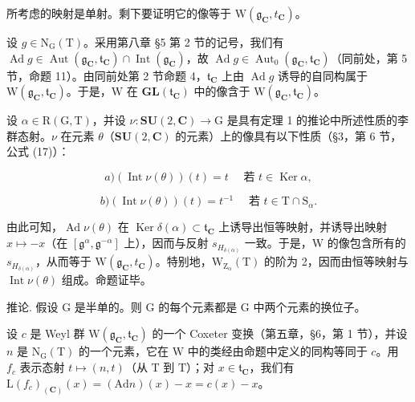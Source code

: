 所考虑的映射是单射。剩下要证明它的像等于 \(\mathrm{W}(\mathfrak{g}_{\mathbf{C}}, t_{\mathbf{C}})\)。

设 \(g \in \mathrm{N}_{\mathrm{G}}(\mathrm{T})\)。采用第八章 §5 第 2 节的记号，我们有 \(\operatorname{Ad} g \in \operatorname{Aut}(\mathfrak{g}_{\mathbf{C}}, \mathfrak{t}_{\mathbf{C}}) \cap \operatorname{Int}(\mathfrak{g}_{\mathbf{C}})\)，故 \(\operatorname{Ad} g \in \operatorname{Aut}_{0}(\mathfrak{g}_{\mathbf{C}}, \mathfrak{t}_{\mathbf{C}})\)（同前处，第 5 节，命题 11）。由同前处第 2 节命题 4，\(\mathfrak{t}_{\mathbf{C}}\) 上由 \(\operatorname{Ad} g\) 诱导的自同构属于 \(\mathrm{W}(\mathfrak{g}_{\mathbf{C}}, \mathfrak{t}_{\mathbf{C}})\)。于是，\(\mathrm{W}\) 在 \(\mathbf{GL}(\mathfrak{t}_{\mathbf{C}})\) 中的像含于 \(\mathrm{W}(\mathfrak{g}_{\mathbf{C}}, \mathfrak{t}_{\mathbf{C}})\)。

设 \(\alpha \in \mathrm{R}(\mathrm{G},\mathrm{T})\)，并设 \(\nu : \mathbf{SU}(2,\mathbf{C}) \to \mathrm{G}\) 是具有定理 1 的推论中所述性质的李群态射。\(\nu\) 在元素 \(\theta\)（\(\mathbf{SU}(2,\mathbf{C})\) 的元素）上的像具有以下性质（§3，第 6 节，公式 (17)）：

\[
a) (\operatorname{Int} \nu (\theta)) (t) = t \quad \text{ 若 } t \in \operatorname{Ker} \alpha ,
\]

\[
b) (\operatorname{Int} \nu (\theta)) (t) = t ^ {- 1} \quad \text{ 若 } t \in \mathrm{T} \cap \mathrm{S} _ {\alpha}.
\]

由此可知，\(\operatorname{Ad}\nu(\theta)\) 在 \(\operatorname{Ker}\delta(\alpha)\subset\mathfrak{t}_{\mathbf{C}}\) 上诱导出恒等映射，并诱导出映射 \(x\mapsto-x\)（在 \([\mathfrak{g}^{\alpha},\mathfrak{g}^{-\alpha}]\) 上），因而与反射 \(s_{H_{\delta(\alpha)}}\) 一致。于是，W 的像包含所有的 \(s_{H_{\delta(\alpha)}}\)，从而等于 \(\mathrm{W}(\mathfrak{g}_{\mathbf{C}}, t_{\mathbf{C}})\)。特别地，\(\mathrm{W}_{\mathrm{Z}_{\alpha}}(\mathrm{T})\) 的阶为 2，因而由恒等映射与 \(\operatorname{Int}\nu(\theta)\) 组成。命题证毕。

推论. 假设 G 是半单的。则 G 的每个元素都是 G 中两个元素的换位子。

设 \(c\) 是 Weyl 群 \(\mathrm{W}(\mathfrak{g}_{\mathbf{C}},\mathfrak{t}_{\mathbf{C}})\) 的一个 Coxeter 变换（第五章，§6，第 1 节），并设 \(n\) 是 \(\mathrm{N}_{\mathrm{G}}(\mathrm{T})\) 的一个元素，它在 \(\mathrm{W}\) 中的类经由命题中定义的同构等同于 \(c\)。用 \(f_{c}\) 表示态射 \(t\mapsto (n,t)\)（从 \(\mathrm{T}\) 到 \(\mathrm{T}\)）；对 \(x\in \mathfrak{t}_{\mathbf{C}}\)，我们有 \(\mathrm{L}(f_c)_{(\mathbf{C})}(x) = (\mathrm{Ad}n)(x) - x = c(x) - x\)。

